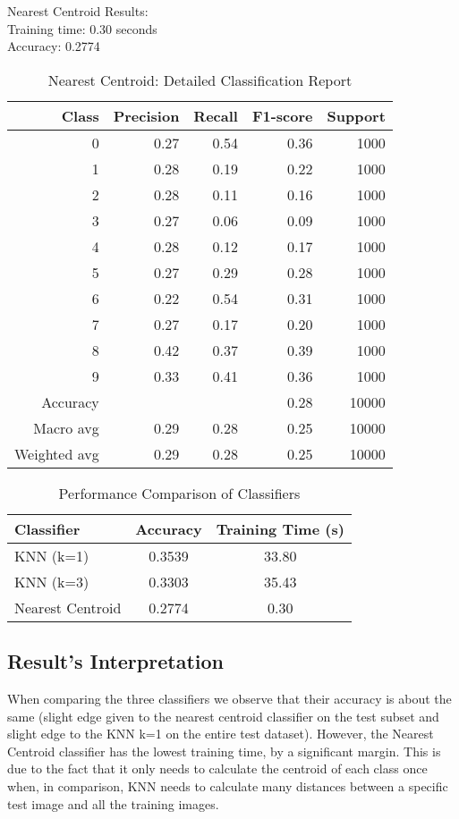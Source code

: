 Nearest Centroid Results:\\
Training time: 0.30 seconds\\
Accuracy: 0.2774
\begin{table}[H]
  \centering
  \begin{tabular}{r r r r r}
    \toprule
    Class & Precision & Recall & F1-score & Support \\
    \midrule
    0 & 0.27 & 0.54 & 0.36 & 1000 \\
    1 & 0.28 & 0.19 & 0.22 & 1000 \\
    2 & 0.28 & 0.11 & 0.16 & 1000 \\
    3 & 0.27 & 0.06 & 0.09 & 1000 \\
    4 & 0.28 & 0.12 & 0.17 & 1000 \\
    5 & 0.27 & 0.29 & 0.28 & 1000 \\
    6 & 0.22 & 0.54 & 0.31 & 1000 \\
    7 & 0.27 & 0.17 & 0.20 & 1000 \\
    8 & 0.42 & 0.37 & 0.39 & 1000 \\
    9 & 0.33 & 0.41 & 0.36 & 1000 \\
    \midrule
    Accuracy & & & 0.28 & 10000 \\
    Macro avg & 0.29 & 0.28 & 0.25 & 10000 \\
    Weighted avg & 0.29 & 0.28 & 0.25 & 10000 \\
    \bottomrule
  \end{tabular}
  \vspace{10pt}
  \caption{Nearest Centroid: Detailed Classification Report}
\end{table}

\begin{table}[H]
  \centering
  \begin{tabular}{lcc}
    \toprule
    Classifier & Accuracy & Training Time (s) \\
    \midrule
    KNN (k=1) & 0.3539 & 33.80 \\
    KNN (k=3) & 0.3303 & 35.43 \\
    Nearest Centroid & 0.2774 & 0.30 \\
    \bottomrule
  \end{tabular}
  \vspace{10pt}
  \caption{Performance Comparison of Classifiers}
\end{table}

\subsection{Result's Interpretation}
When comparing the three classifiers we observe that their accuracy is about the same (slight edge 
given to the nearest centroid classifier on the test subset and slight edge to the KNN k=1 on the 
entire test dataset). However, the Nearest Centroid classifier has the lowest training time, by a 
significant margin. This is due to the fact that it only needs to calculate the centroid of each 
class once when, in comparison, KNN needs to calculate many distances between a specific test image 
and all the training images.

